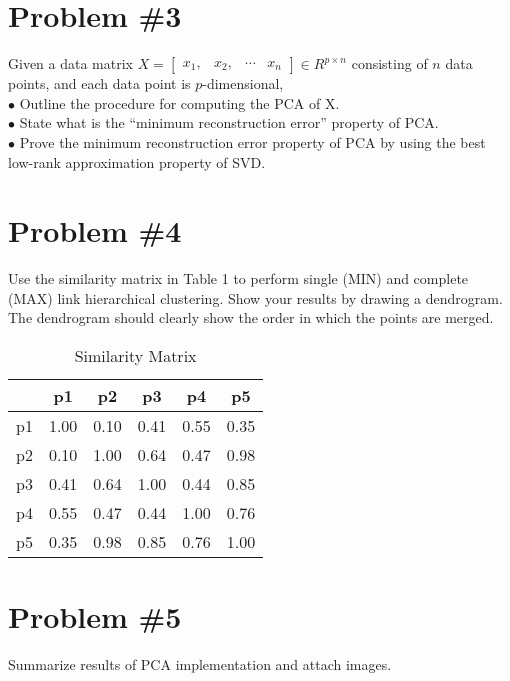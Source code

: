 \documentclass[12pt]{article}
\begin{document}
	\section*{Problem \#3}
	Given a data matrix $X = \left[
	\begin{array}{cccc}
	x_1, & x_2, & \cdots & x_n
	\end{array}
	\right] \in R^{p \times n}$ consisting of $n$ data points, and each data point is $p$-dimensional, \\
	$\bullet$ Outline the procedure for computing the PCA of X.\\
	$\bullet$ State what is the “minimum reconstruction error” property of PCA. \\
	$\bullet$ Prove the minimum reconstruction error property of PCA by using the best low-rank
	approximation property of SVD.
	
	\section*{Problem \#4}
	Use the similarity matrix in Table 1 to perform single
	(MIN) and complete (MAX) link hierarchical clustering. Show your results by drawing a
	dendrogram. The dendrogram should clearly show the order in which the points are merged.
	\begin{table}[H]
		\centering
		\caption{Similarity Matrix}
		\begin{tabular}{c|c|c|c|c|c}
			& \textbf{p1} & \textbf{p2} & \textbf{p3} & \textbf{p4} & \textbf{p5} \\
			\hline
			p1 & 1.00 & 0.10 & 0.41 & 0.55 & 0.35 \\
			p2 & 0.10 & 1.00 & 0.64 & 0.47 & 0.98 \\
			p3 & 0.41 & 0.64 & 1.00 & 0.44 & 0.85 \\
			p4 & 0.55 & 0.47 & 0.44 & 1.00 & 0.76 \\
			p5 & 0.35 & 0.98 & 0.85 & 0.76 & 1.00 \\
			\hline
		\end{tabular}
	\end{table}
	
	\section*{Problem \#5}
	Summarize results of PCA implementation and attach images.
	
	
	
\end{document}
